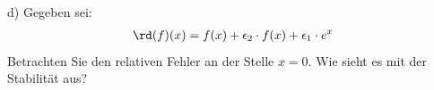 \documentclass{scrartcl}
\begin{document}
	\lbreak 
	\\
	d)
	Gegeben sei:
	\begin{align*}
		\rd(f)(x) = f(x) + \epsilon_2 \cdot f(x) + \epsilon_1 \cdot e^x
	\end{align*}
	Betrachten Sie den relativen Fehler an der Stelle $x=0$. Wie sieht es mit der Stabilität aus?
	
\end{document}
